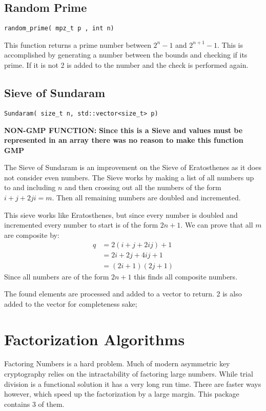 \subsection{Random Prime}
\begin{verbatim}
random_prime( mpz_t p , int n)
\end{verbatim}

This function returns a prime number between $2^n -1$ and $2^{n+1}-1$.
This is accomplished by generating a number between the bounds and checking if its prime.
If it is not 2 is added to the number and the check is performed again.

\subsection{Sieve of Sundaram}
\begin{verbatim}
Sundaram( size_t n, std::vector<size_t> p)
\end{verbatim}
\textbf{ NON-GMP FUNCTION:}
\textbf{Since this is a Sieve and values must be represented in an array there was no reason to make this function GMP} 

The Sieve of Sundaram is an improvement on the Sieve of Eratosthenes as it does not consider even numbers.
The Sieve works by making a list of all numbers up to and including $n$ and then crossing out all the numbers of the form
$i + j + 2ji = m$.
Then all remaining numbers are doubled and incremented.

This sieve works like Eratosthenes, but since every number is doubled and incremented every number to start is of the form $2n +1$.
We can prove that all $m$ are composite by:
\begin{align*}
q &= 2(i+j+2ij)+1\\
&= 2i +2j + 4ij + 1\\
&= (2i + 1 )( 2j + 1)
\end{align*}
Since all numbers are of the form $2n + 1$ this finds all composite numbers.

The found elements are processed and added to a vector to return.
2 is also added to the vector for completeness sake;

\section{Factorization Algorithms}

Factoring Numbers is a hard problem. 
Much of modern asymmetric key cryptography relies on the intractability of factoring large numbers.
While trial division is a functional solution it has a very long run time.
There are faster ways however, which speed up the factorization by a large margin.
This package contains 3 of them.

